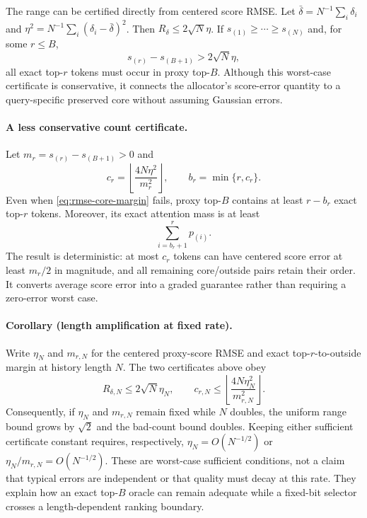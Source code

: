 The range can be certified directly from centered score RMSE.
Let $\bar\delta=N^{-1}\sum_i\delta_i$ and
$\eta^2=N^{-1}\sum_i(\delta_i-\bar\delta)^2$.
Then $R_\delta\le2\sqrt{N}\eta$.
If $s_{(1)}\ge\cdots\ge s_{(N)}$ and, for some $r\le B$,
\begin{equation}
 s_{(r)}-s_{(B+1)}>2\sqrt{N}\eta,
 \label{eq:rmse-core-margin}
\end{equation}
all exact top-$r$ tokens must occur in proxy top-$B$.
Although this worst-case certificate is conservative, it connects the
allocator's score-error quantity to a query-specific preserved core without
assuming Gaussian errors.

\paragraph{A less conservative count certificate.}
Let $m_r=s_{(r)}-s_{(B+1)}>0$ and
\begin{equation}
 c_r=\left\lfloor\frac{4N\eta^2}{m_r^2}\right\rfloor,
 \qquad b_r=\min\{r,c_r\}.
 \label{eq:rmse-bad-count}
\end{equation}
Even when \cref{eq:rmse-core-margin} fails, proxy top-$B$ contains at least
$r-b_r$ exact top-$r$ tokens.  Moreover, its exact attention mass is at
least
\begin{equation}
 \sum_{i=b_r+1}^{r}p_{(i)}.
 \label{eq:rmse-mass-count}
\end{equation}
The result is deterministic: at most $c_r$ tokens can have centered score
error at least $m_r/2$ in magnitude, and all remaining core/outside pairs
retain their order.  It converts average score error into a graded guarantee
rather than requiring a zero-error worst case.

\paragraph{Corollary (length amplification at fixed rate).}
Write $\eta_N$ and $m_{r,N}$ for the centered proxy-score RMSE and exact
top-$r$-to-outside margin at history length $N$.  The two certificates above
obey
\begin{equation}
 R_{\delta,N}\le2\sqrt{N}\eta_N,\qquad
 c_{r,N}\le
 \left\lfloor
 \frac{4N\eta_N^2}{m_{r,N}^2}
 \right\rfloor .
 \label{eq:length-amplification}
\end{equation}
Consequently, if $\eta_N$ and $m_{r,N}$ remain fixed while $N$ doubles, the
uniform range bound grows by $\sqrt{2}$ and the bad-count bound doubles.
Keeping either sufficient certificate constant requires, respectively,
$\eta_N=O(N^{-1/2})$ or
$\eta_N/m_{r,N}=O(N^{-1/2})$.  These are worst-case sufficient conditions,
not a claim that typical errors are independent or that quality must decay
at this rate.  They explain how an exact top-$B$ oracle can remain adequate
while a fixed-bit selector crosses a length-dependent ranking boundary.

